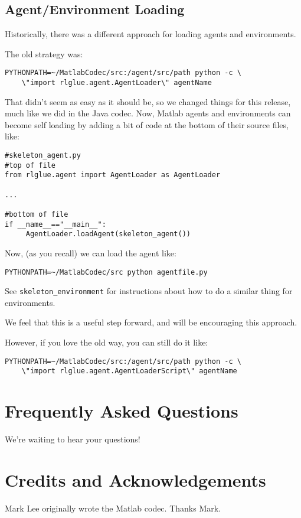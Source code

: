 \documentclass[11pt]{article}
\begin{document}
\subsection{Agent/Environment Loading}
Historically, there was a different approach for loading agents and environments.

The old strategy was:
\begin{verbatim}
PYTHONPATH=~/MatlabCodec/src:/agent/src/path python -c \
    \"import rlglue.agent.AgentLoader\" agentName
\end{verbatim}

That didn't seem as easy as it should be, so we changed things for this release, much like we did in the Java codec. Now, Matlab agents and environments can become 
self loading by adding a bit of code at the bottom of their source files, like:
\begin{verbatim}
#skeleton_agent.py
#top of file
from rlglue.agent import AgentLoader as AgentLoader

...

#bottom of file
if __name__=="__main__":
     AgentLoader.loadAgent(skeleton_agent())
\end{verbatim}

Now, (as you recall) we can load the agent like:
\begin{verbatim}
PYTHONPATH=~/MatlabCodec/src python agentfile.py
\end{verbatim}

See \texttt{skeleton\_environment} for instructions about how to do a similar thing for environments.

We feel that this is a useful step forward, and will be encouraging this approach.

However, if you love the old way, you can still do it like:

\begin{verbatim}
PYTHONPATH=~/MatlabCodec/src:/agent/src/path python -c \
    \"import rlglue.agent.AgentLoaderScript\" agentName
\end{verbatim}


\section{Frequently Asked Questions}
We're waiting to hear your questions!

\section{Credits and Acknowledgements}
Mark Lee originally wrote the Matlab codec.  Thanks Mark.
\end{document}
